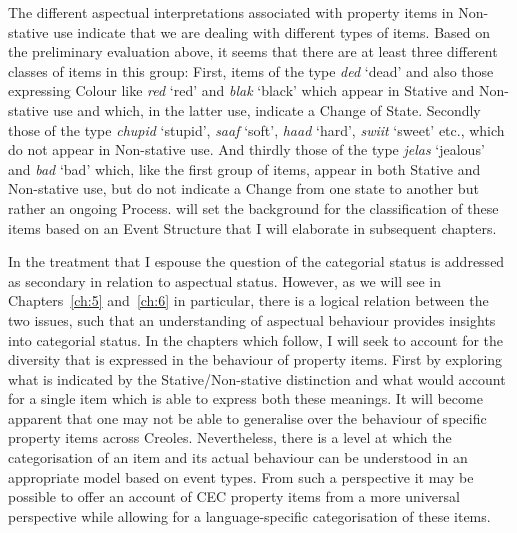 The different aspectual interpretations associated with property items
in Non-stative use indicate that we are dealing with different types
of items.  Based on the preliminary evaluation above, it seems that
there are at least three different classes of items in this group:
First, items of the type \textit{ded}  `dead' and also those expressing
Colour like \textit{red} `red' and {\textit{blak}} `black' which appear in Stative and
Non-stative use and which, in the latter use, indicate a Change of
State.  Secondly those of the type \textit{chupid} `stupid',
\textit{saaf} `soft', \textit{haad} `hard', \textit{swiit} `sweet'
etc., which do not appear in Non-stative use.  And thirdly those of the
type \textit{jelas} `jealous' and \textit{bad} `bad' which, like the
first group of items, appear in both Stative and Non-stative use, but
do not indicate a Change from one state to another but rather an
ongoing Process.   will set the background for the
classification of these items based on an Event Structure that I will
elaborate in subsequent chapters.

In the treatment that I espouse the question of the categorial status
is addressed as secondary in relation to aspectual status. However, as
we will see in Chapters~\ref{ch:5} and~\ref{ch:6} in particular, there is a logical
relation between the two issues, such that an understanding of
aspectual behaviour provides insights into categorial status. In the
chapters which follow, I will seek to account for the diversity that
is expressed in the behaviour of property items.  First by exploring
what is indicated by the Stative\slash Non-stative distinction and what
would account for a single item which is able to express both these
meanings.  It will become apparent that one may not be able to
generalise over the behaviour of specific property items across
Creoles.  Nevertheless, there is a level at which the categorisation
of an item and its actual behaviour can be understood in an
appropriate model based on event types.  From such a perspective it
may be possible to offer an account of CEC property items from a more
universal perspective while allowing for a language-specific
categorisation of these items.
